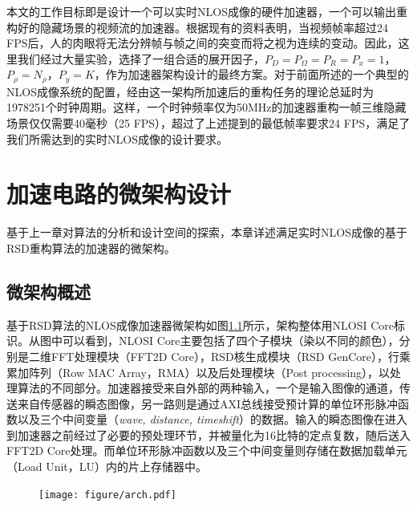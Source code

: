 \documentclass[master]{shtthesis}             %
\begin{document}
本文的工作目标即是设计一个可以实时NLOS成像的硬件加速器，一个可以输出重构好的隐藏场景的视频流的加速器。根据现有的资料表明，当视频帧率超过24 FPS后，人的肉眼将无法分辨帧与帧之间的突变而将之视为连续的变动。因此，这里我们经过大量实验，选择了一组合适的展开因子，$P_D=P_\Omega=P_R=P_x=1$，$P_\rho=N_\rho$，$P_y=K$，作为加速器架构设计的最终方案。对于前面所述的一个典型的NLOS成像系统的配置，经由这一架构所加速后的重构任务的理论总延时为1978251个时钟周期。这样，一个时钟频率仅为50MHz的加速器重构一帧三维隐藏场景仅仅需要40毫秒（25 FPS），超过了上述提到的最低帧率要求24 FPS，满足了我们所需达到的实时NLOS成像的设计要求。%

\chapter{加速电路的微架构设计}

基于上一章对算法的分析和设计空间的探索，本章详述满足实时NLOS成像的基于RSD重构算法的加速器的微架构。

\section{微架构概述} \label{sec::setup_info}

基于RSD算法的NLOS成像加速器微架构如图\ref{fig:arch}所示，架构整体用NLOSI Core标识。从图中可以看到，NLOSI Core主要包括了四个子模块（染以不同的颜色），分别是二维FFT处理模块（FFT2D Core），RSD核生成模块（RSD GenCore），行乘累加阵列（Row MAC Array，RMA）以及后处理模块（Post processing），以处理算法的不同部分。加速器接受来自外部的两种输入，一个是输入图像的通道，传送来自传感器的瞬态图像，另一路则是通过AXI总线接受预计算的单位环形脉冲函数以及三个中间变量（\textit{wave, distance, timeshift}）的数据。输入的瞬态图像在进入到加速器之前经过了必要的预处理环节，并被量化为16比特的定点复数，随后送入FFT2D Core处理。而单位环形脉冲函数以及三个中间变量则存储在数据加载单元（Load Unit，LU）内的片上存储器中。
\begin{figure}[!htb]
    \centering
    \texttt{[image: figure/arch.pdf]}
    \label{fig:arch}
\end{figure}
\end{document}
